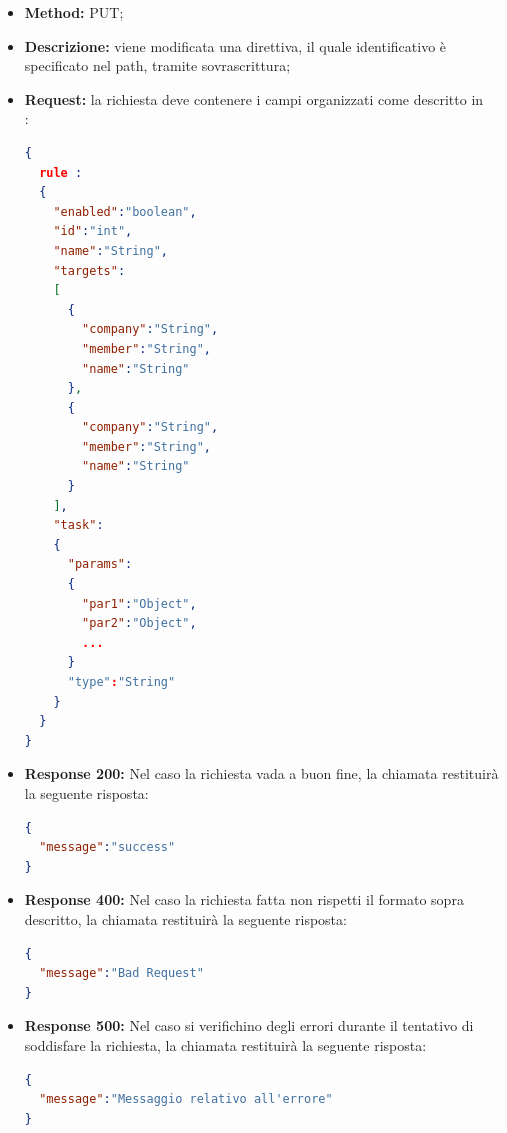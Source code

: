 \begin{itemize}
\begin{itemize}
\item \textbf{Method:} PUT;
\item \textbf{Descrizione:} viene modificata una direttiva, il quale identificativo è specificato nel path, tramite sovrascrittura;
\item \textbf{Request:} la richiesta deve contenere i campi organizzati come descritto in \\:
\begin{lstlisting}[language=json,firstnumber=1]
{
  rule :
  {
    "enabled":"boolean",
    "id":"int",
    "name":"String",
    "targets":
    [
      {
        "company":"String",
        "member":"String",
        "name":"String"
      },
      {
        "company":"String",
        "member":"String",
        "name":"String"
      }
    ],
    "task":
    {
      "params":
      {
        "par1":"Object",
        "par2":"Object",
        ...
      }
      "type":"String"
    }
  }
}
\end{lstlisting}
\item \textbf{Response 200:} Nel caso la richiesta vada a buon fine, la chiamata restituirà la seguente risposta:
\begin{lstlisting}[language=json,firstnumber=1]
{
  "message":"success"
}
\end{lstlisting}
\item \textbf{Response 400:} Nel caso la richiesta fatta non rispetti il formato sopra descritto, la chiamata restituirà la seguente risposta:
\begin{lstlisting}[language=json,firstnumber=1]
{
  "message":"Bad Request"
}
\end{lstlisting}
\item \textbf{Response 500:} Nel caso si verifichino degli errori durante il tentativo di soddisfare la richiesta, la chiamata restituirà la seguente risposta:
\begin{lstlisting}[language=json,firstnumber=1]
{
  "message":"Messaggio relativo all'errore"
}
\end{lstlisting}
\end{itemize}


\end{itemize}
